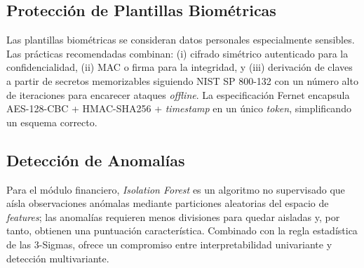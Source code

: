 \subsection{Protección de Plantillas Biométricas}
\label{subsec:proteccion}

Las plantillas biométricas se consideran datos personales especialmente sensibles. Las prácticas recomendadas combinan: (i) cifrado simétrico autenticado para la confidencialidad, (ii) MAC o firma para la integridad, y (iii) derivación de claves a partir de secretos memorizables siguiendo NIST SP 800-132 \cite{nist800132} con un número alto de iteraciones para encarecer ataques \textit{offline}. La especificación Fernet \cite{fernet} encapsula AES-128-CBC + HMAC-SHA256 + \textit{timestamp} en un único \textit{token}, simplificando un esquema correcto.

\subsection{Detección de Anomalías}
\label{subsec:anomalias}

Para el módulo financiero, \textit{Isolation Forest} \cite{liu2008isolation} es un algoritmo no supervisado que aísla observaciones anómalas mediante particiones aleatorias del espacio de \textit{features}; las anomalías requieren menos divisiones para quedar aisladas y, por tanto, obtienen una puntuación característica. Combinado con la regla estadística de las 3-Sigmas, ofrece un compromiso entre interpretabilidad univariante y detección multivariante.
